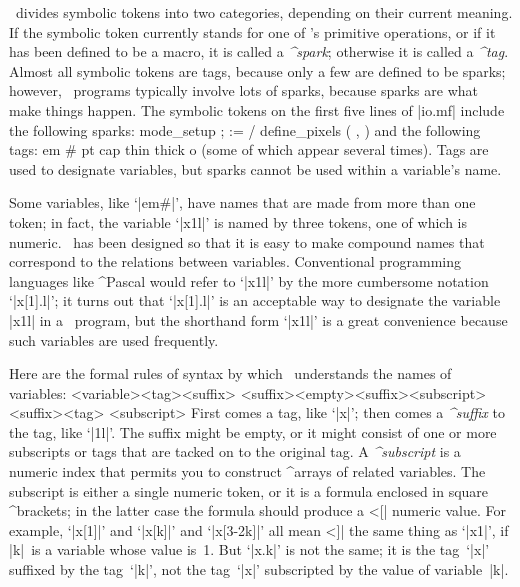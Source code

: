 {\MF\ divides symbolic tokens into two categories, depending on their
current meaning. If the symbolic token currently stands for one of \MF's
primitive operations, or if it has been defined to be a macro, it is
called a {\sl^{spark}\/}; otherwise it is called a {\sl^{tag}}. Almost
all symbolic tokens are tags, because only a few are defined to be sparks;
however, \MF\ programs typically involve lots of sparks, because sparks
are what make things happen. The symbolic tokens on the first five lines
of |io.mf| include the following sparks:
\begintt
mode_setup  ;  :=  /  define_pixels  (  ,  )
\endtt
and the following tags:
\begintt
em  #  pt  cap  thin  thick  o
\endtt
(some of which appear several times). Tags are used to designate variables,
but sparks cannot be used within a variable's name.

Some variables, like `|em#|', have names that are made from more than one token;
in fact, the variable `|x1l|' is named by three tokens, one of which is
numeric. \MF\ has been designed so that it is easy to make compound names
that correspond to the relations between variables. Conventional programming
languages like ^{Pascal} would refer to `|x1l|' by the more
cumbersome notation `|x[1].l|'; it turns out that `|x[1].l|' is an
acceptable way to designate the variable |x1l| in a \MF\ program, but the
shorthand form `|x1l|' is a great convenience because such variables
are used frequently.

Here are the formal rules of syntax by which \MF\ understands the names of
variables:
\def\\#1{\thinspace{\tt#1}\thinspace}
\beginsyntax
<variable>\is<tag><suffix>
<suffix>\is<empty>\alt<suffix><subscript>\alt<suffix><tag>
<subscript>\alt\\{\char`\[}<numeric expression>\\]
\endsyntax
First comes a tag, like `|x|'; then comes a {\sl^{suffix}\/} to the tag,
like `|1l|'.
The suffix might be empty, or it might consist of one or more subscripts
or tags that are tacked on to the original tag. A {\sl^{subscript}\/} is
a numeric index that permits you to construct ^{arrays} of related
variables. The subscript is either a single numeric token, or it is a formula
enclosed in square ^{brackets}; in the latter case the formula should produce a
^^|[| numeric value. For example, `|x[1]|' and `|x[k]|' and `|x[3-2k]|' all mean
^^|]| the same thing as `|x1|', if\/ |k|~is a variable whose value is~1. But
`|x.k|' is not the same; it is the tag~`|x|' suffixed by the tag~`|k|',
not the tag~`|x|' subscripted by the value of variable~|k|.

}
